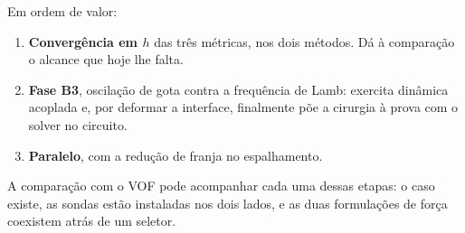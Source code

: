 Em ordem de valor:

\begin{enumerate}
  \item \textbf{Converg\^encia em $h$} das tr\^es m\'etricas, nos dois m\'etodos.
    D\'a \`a compara\c{c}\~ao o alcance que hoje lhe falta.
  \item \textbf{Fase B3}, oscila\c{c}\~ao de gota contra a frequ\^encia de Lamb:
    exercita din\^amica acoplada e, por deformar a interface, finalmente p\~oe a
    cirurgia \`a prova com o solver no circuito.
  \item \textbf{Paralelo}, com a redu\c{c}\~ao de franja no espalhamento.
\end{enumerate}

A compara\c{c}\~ao com o VOF pode acompanhar cada uma dessas etapas: o caso
existe, as sondas est\~ao instaladas nos dois lados, e as duas formula\c{c}\~oes
de for\c{c}a coexistem atr\'as de um seletor.

